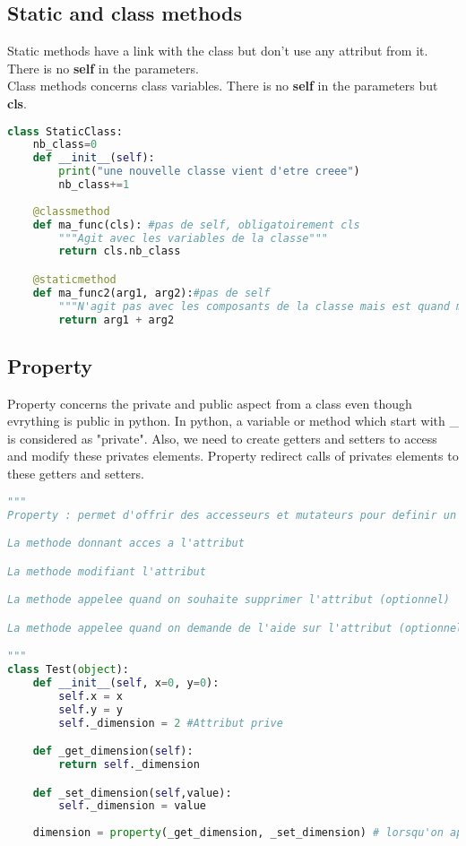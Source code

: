 \documentclass[a4paper, 12pt]{article}
\begin{document}
\subsection{Static and class methods}
Static methods have a link with the class but don't use any attribut from it. There is no \textbf{self} in the parameters. \\
Class methods concerns class variables. There is no \textbf{self} in the parameters but \textbf{cls}.
\begin{lstlisting}[language=Python]
class StaticClass:
	nb_class=0
	def __init__(self):
		print("une nouvelle classe vient d'etre creee")
		nb_class+=1
	
	@classmethod
	def ma_func(cls): #pas de self, obligatoirement cls
		"""Agit avec les variables de la classe"""
		return cls.nb_class

	@staticmethod
	def ma_func2(arg1, arg2):#pas de self
		"""N'agit pas avec les composants de la classe mais est quand meme en lien avec la classe"""
		return arg1 + arg2
\end{lstlisting}

\subsection{Property}
Property concerns the private and public aspect from a class even though evrything is public in python. In python, a variable or method which start with \_ is considered as "private". Also, we need to create getters and setters to access and modify these privates elements. Property redirect calls of privates elements to these getters and setters.
\begin{lstlisting}[language=Python]
"""
Property : permet d'offrir des accesseurs et mutateurs pour definir un attribut prive

La methode donnant acces a l'attribut

La methode modifiant l'attribut

La methode appelee quand on souhaite supprimer l'attribut (optionnel)

La methode appelee quand on demande de l'aide sur l'attribut (optionnel)

"""
class Test(object):
	def __init__(self, x=0, y=0):
		self.x = x
		self.y = y
		self._dimension = 2 #Attribut prive

	def _get_dimension(self):
		return self._dimension

	def _set_dimension(self,value):
		self._dimension = value
		
	dimension = property(_get_dimension, _set_dimension) # lorsqu'on appelera objet.dimension, property redirigera vers les accesseurs/mutateurs prives
\end{lstlisting}
\end{document}
